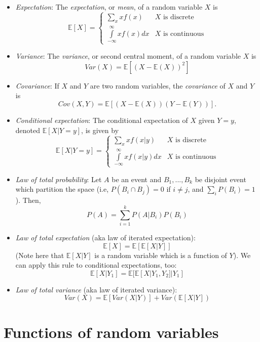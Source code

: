 \documentclass[11pt]{article}
\begin{document}
\begin{itemize}
\item \textit{Expectation}: The \textit{expectation}, or \textit{mean}, of a random variable $X$ is 
$$\mathbb{E}[X] = \begin{cases}
\sum \limits_{x} x f(x) & X \text{ is discrete} \\
\int \limits_{-\infty}^{\infty} x f(x) dx & X \text{ is continuous}
\end{cases}$$

\item \textit{Variance}: The \textit{variance}, or second central moment, of a random variable $X$ is
$$Var(X) = \mathbb{E}[(X - \mathbb{E}(X))^2]$$

\item \textit{Covariance}: If $X$ and $Y$ are two random variables, the \textit{covariance} of $X$ and $Y$ is 
$$Cov(X, Y) = \mathbb{E}[(X - \mathbb{E}(X))(Y - \mathbb{E}(Y))].$$

\item \textit{Conditional expectation}: The conditional expectation of $X$ given $Y = y$, denoted $\mathbb{E}[X|Y = y]$, is given by
$$\mathbb{E}[X|Y = y] = \begin{cases}
\sum \limits_x x f(x|y) & X \text{ is discrete}\\
\int \limits_{-\infty}^\infty x f(x|y) dx & X \text{ is continuous}
\end{cases}$$

\item \textit{Law of total probability}: Let $A$ be an event and $B_1,...,B_k$ be disjoint event which partition the space (i.e, $P(B_i \cap B_j) = 0$ if $i \neq j$, and $\sum_i P(B_i) = 1$). Then,
$$P(A) = \sum \limits_{i=1}^k P(A | B_i) P(B_i)$$

\item \textit{Law of total expectation} (aka law of iterated expectation):
$$\mathbb{E}[X] = \mathbb{E}[\mathbb{E}[X|Y]]$$
(Note here that $\mathbb{E}[X|Y]$ is a random variable which is a function of $Y$). We can apply this rule to conditional expectations, too:
$$\mathbb{E}[X | Y_1] = \mathbb{E}[\mathbb{E}[X | Y_1, Y_2] | Y_1]$$

\item \textit{Law of total variance} (aka law of iterated variance):
$$Var(X) = \mathbb{E}[Var(X|Y)] + Var(\mathbb{E}[X|Y])$$

\end{itemize}

\section*{Functions of random variables}
\end{document}
